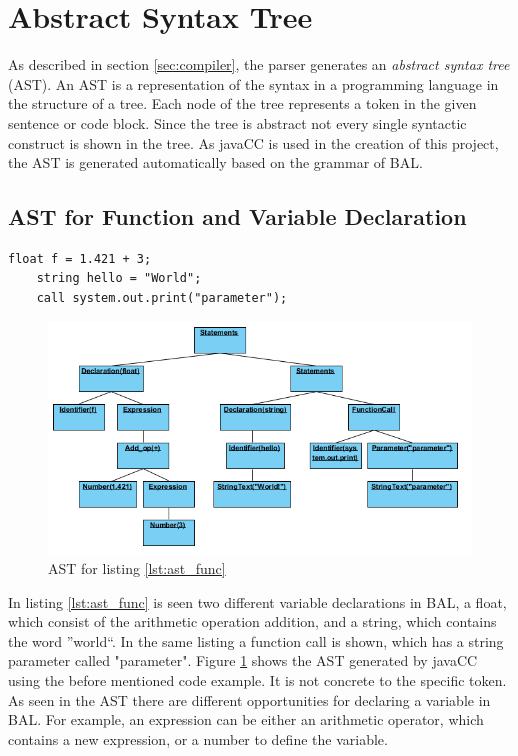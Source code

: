 \section{Abstract Syntax Tree}
\label{sec:AST}
As described in section \ref{sec:compiler}, the parser generates an \textit{abstract syntax tree} (AST). An AST is a representation of the syntax in a programming language in the structure of a tree. Each node of the tree represents a token in the given sentence or code block. Since the tree is abstract not every single syntactic construct is shown in the tree. As javaCC is used in the creation of this project, the AST is generated automatically based on the grammar of BAL.

\subsection{AST for Function and Variable Declaration}
\begin{lstlisting}[caption=Different variable declarations and a function call, label=lst:ast_func]
	float f = 1.421 + 3;
	string hello = "World";
	call system.out.print("parameter");
\end{lstlisting}
\begin{figure}[H]
	\centering
		\includegraphics[width=\textwidth]{billeder/function_AST.png}
		\caption{AST for listing \ref{lst:ast_func}}
		\label{fig:ast_func}
\end{figure}
In listing \ref{lst:ast_func} is seen two different variable declarations in BAL, a float, which consist of the arithmetic operation addition, and a string, which contains the word ''world``. In the same listing a function call is shown, which has a string parameter called "parameter". Figure \ref{fig:ast_func} shows the AST generated by javaCC using the before mentioned code example. It is not concrete to the specific token. As seen in the AST there are different opportunities for declaring a variable in BAL. For example, an expression can be either an arithmetic operator, which contains a new expression, or a number to define the variable.

